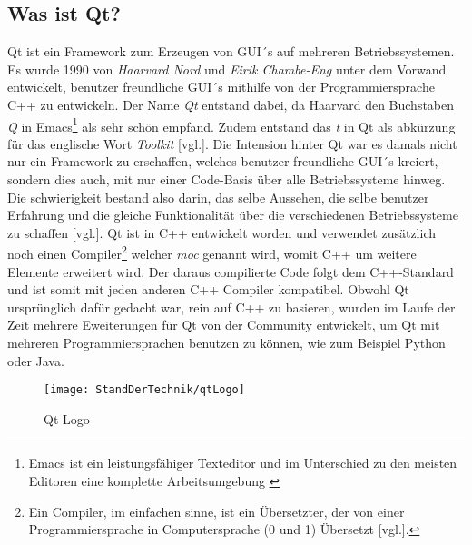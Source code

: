\subsection{Was ist Qt?}
\label{subsec:WasIstQt}
Qt ist ein Framework zum Erzeugen von GUI´s auf mehreren Betriebssystemen. Es wurde 1990 von
\emph{Haarvard Nord} und \emph{Eirik Chambe-Eng} unter dem Vorwand entwickelt, benutzer
freundliche GUI´s mithilfe von der Programmiersprache C++ zu entwickeln. Der Name \emph{Qt}
entstand dabei, da Haarvard den Buchstaben \emph{Q} in Emacs\footnote{Emacs ist ein
leistungsfähiger Texteditor und im Unterschied zu den meisten Editoren eine komplette
Arbeitsumgebung \cite{EmacsKurz}} als sehr schön empfand. Zudem entstand das \emph{t} in Qt als
abkürzung für das englische Wort \emph{Toolkit} \cite{qtStory}[vgl.].
\newline
\newline
Die Intension hinter Qt war es damals nicht nur ein Framework zu erschaffen, welches benutzer
freundliche GUI´s kreiert, sondern dies auch, mit nur einer Code-Basis über alle Betriebssysteme
hinweg. Die schwierigkeit bestand also darin, das selbe Aussehen, die selbe benutzer Erfahrung
und die gleiche Funktionalität über die verschiedenen Betriebssysteme zu
schaffen \cite{GettingStartedQt}[vgl.].
\newline
\newline
Qt ist in C++ entwickelt worden und verwendet zusätzlich noch einen Compiler\footnote{Ein
Compiler, im einfachen sinne, ist ein Übersetzter, der von einer Programmiersprache in
Computersprache (0 und 1) Übersetzt \cite{WasIstEinCompiler}[vgl.].} welcher
\emph{\ac{moc}} genannt wird, womit C++ um weitere Elemente erweitert wird. Der daraus
compilierte Code folgt dem C++-Standard und ist somit mit jeden anderen C++ Compiler kompatibel.
Obwohl Qt ursprünglich dafür gedacht war, rein auf C++ zu basieren, wurden im Laufe der Zeit
mehrere Eweiterungen für Qt von der Community entwickelt, um Qt mit mehreren Programmiersprachen
benutzen zu können, wie zum Beispiel Python oder Java.
\begin{figure}[h]
    \centering
    \texttt{[image: StandDerTechnik/qtLogo]}
    \caption[Qt Logo]{Qt Logo}
    \label{img:qtLogo}
\end{figure}